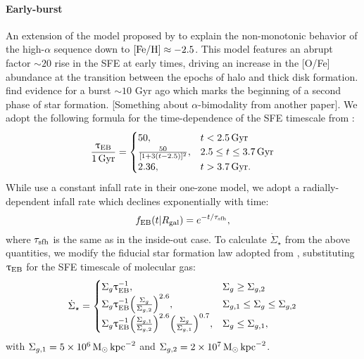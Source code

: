 \documentclass[twocolumn,twocolappendix,linenumbers,trackchanges]{aastex631}
\begin{document}
\paragraph{Early-burst} An extension of the model proposed by \citet{Conroy2022-ThickDisk} to explain the non-monotonic behavior of the high-$\alpha$ sequence down to ${\rm [Fe/H]}\approx-2.5$. This model features an abrupt factor $\sim20$ rise in the SFE at early times, driving an increase in the [O/Fe] abundance at the transition between the epochs of halo and thick disk formation. \citet{Stahlholdt2022-StarFormationEpochs} find evidence for a burst $\sim10$ Gyr ago which marks the beginning of a second phase of star formation. [Something about $\alpha$-bimodality from another paper]. We adopt the following formula for the time-dependence of the SFE timescale from \citet{Conroy2022-ThickDisk}:
\begin{equation}
    \frac{\uptau_{\rm EB}}{1\,\rm{Gyr}} =
    \begin{cases}
        50, & t < 2.5\,\rm{Gyr} \\
        \frac{50}{[1+3(t-2.5)]^2}, & 2.5\leq t \leq 3.7\,\rm{Gyr} \\
        2.36, & t > 3.7\,\rm{Gyr}.
    \end{cases}
    \label{eq:earlyburst-taustar}
\end{equation}
While \citet{Conroy2022-ThickDisk} use a constant infall rate in their one-zone model, we adopt a radially-dependent infall rate which declines exponentially with time:
\begin{equation}
    f_{\rm EB}(t|R_{\rm gal}) = e^{-t/\tau_{\rm sfh}},
    \label{eq:earlyburst-ifr}
\end{equation}
where $\tau_{\rm sfh}$ is the same as in the inside-out case.
To calculate $\dot \Sigma_\star$ from the above quantities, we modify the fiducial star formation law adopted from , substituting $\uptau_{\rm EB}$ for the SFE timescale of molecular gas:
\begin{equation}
    \dot \Sigma_\star = 
    \begin{cases}
        \Sigma_g \uptau_{\rm EB}^{-1}, & \Sigma_g \geq \Sigma_{g,2} \\
        \Sigma_g \uptau_{\rm EB}^{-1} \Big(\frac{\Sigma_g}{\Sigma_{g,2}}\Big)^{2.6}, & \Sigma_{g,1} \leq \Sigma_g \leq \Sigma_{g,2} \\
        \Sigma_g \uptau_{\rm EB}^{-1} \Big(\frac{\Sigma_{g,1}}{\Sigma_{g,2}}\Big)^{2.6} \Big(\frac{\Sigma_g}{\Sigma_{g,1}}\Big)^{0.7}, & \Sigma_g \leq \Sigma_{g,1},
    \end{cases}
    \label{eq:earlyburst-sfr}
\end{equation}
with $\Sigma_{g,1}=5\times 10^6\,{\rm M}_\odot\,{\rm kpc}^{-2}$ and $\Sigma_{g,2}=2\times 10^7\,{\rm M}_\odot\,{\rm kpc}^{-2}$.
\end{document}
